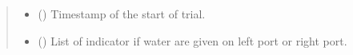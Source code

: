\documentclass[letterpaper,10pt,english]{sphinxmanual}
\begin{document}
\begin{fulllineitems}
\begin{fulllineitems}
\begin{quote}
\begin{description}
\begin{itemize}
\item {} 
\sphinxAtStartPar
{} () \textendash{} Timestamp of the start of trial.

\item {} 
\sphinxAtStartPar
{} () \textendash{} List of indicator if water are given on left port or right port.

\end{itemize}


\end{description}\end{quote}

\end{fulllineitems}


\end{fulllineitems}

\end{document}
